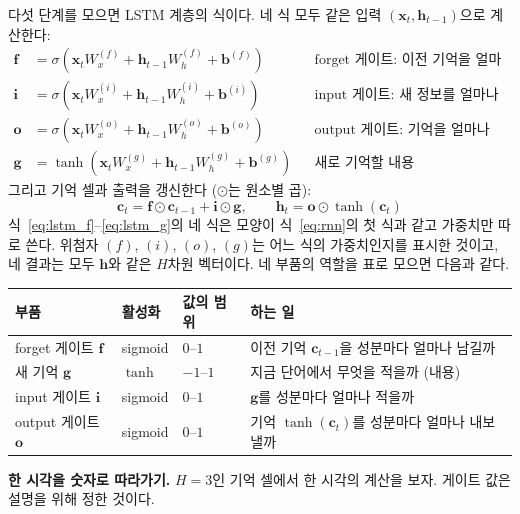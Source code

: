 \documentclass[11pt,a4paper]{article}
\newcommand{\eqnref}[1]{식~\eqref{eq:#1}}
\newcommand{\vect}[1]{\bm{#1}}
\begin{document}
다섯 단계를 모으면 LSTM 계층의 식이다. 네 식 모두 같은 입력 $(\vect x_t,\vect h_{t-1})$으로 계산한다:
\begin{align}
\vect f&=\sigma(\vect x_tW_x^{(f)}+\vect h_{t-1}W_h^{(f)}+\vect b^{(f)}) &&\text{forget 게이트: 이전 기억을 얼마나 남길까}\label{eq:lstm_f}\\
\vect i&=\sigma(\vect x_tW_x^{(i)}+\vect h_{t-1}W_h^{(i)}+\vect b^{(i)}) &&\text{input 게이트: 새 정보를 얼마나 더할까}\\
\vect o&=\sigma(\vect x_tW_x^{(o)}+\vect h_{t-1}W_h^{(o)}+\vect b^{(o)}) &&\text{output 게이트: 기억을 얼마나 내보낼까}\\
\vect g&=\tanh(\vect x_tW_x^{(g)}+\vect h_{t-1}W_h^{(g)}+\vect b^{(g)}) &&\text{새로 기억할 내용}\label{eq:lstm_g}
\end{align}
그리고 기억 셀과 출력을 갱신한다 ($\odot$는 원소별 곱):
\begin{equation}
\boxed{\;\vect c_t=\vect f\odot\vect c_{t-1}+\vect i\odot\vect g,\qquad \vect h_t=\vect o\odot\tanh(\vect c_t)\;}\label{eq:lstm_c}
\end{equation}
식~\eqref{eq:lstm_f}--\eqref{eq:lstm_g}의 네 식은 모양이 \eqnref{rnn}의 첫 식과 같고 가중치만 따로 쓴다. 위첨자 $(f)$, $(i)$, $(o)$, $(g)$는 어느 식의 가중치인지를 표시한 것이고, 네 결과는 모두 $\vect h$와 같은 $H$차원 벡터이다.
네 부품의 역할을 표로 모으면 다음과 같다.

\begin{center}
\begin{tabular}{@{}llll@{}}
\toprule
부품 & 활성화 & 값의 범위 & 하는 일 \\
\midrule
forget 게이트 $\vect f$ & sigmoid & $0$--$1$ & 이전 기억 $\vect c_{t-1}$을 성분마다 얼마나 남길까 \\
새 기억 $\vect g$ & $\tanh$ & $-1$--$1$ & 지금 단어에서 무엇을 적을까 (내용) \\
input 게이트 $\vect i$ & sigmoid & $0$--$1$ & $\vect g$를 성분마다 얼마나 적을까 \\
output 게이트 $\vect o$ & sigmoid & $0$--$1$ & 기억 $\tanh(\vect c_t)$를 성분마다 얼마나 내보낼까 \\
\bottomrule
\end{tabular}
\end{center}

\textbf{한 시각을 숫자로 따라가기.} $H=3$인 기억 셀에서 한 시각의 계산을 보자. 게이트 값은 설명을 위해 정한 것이다.
\end{document}
